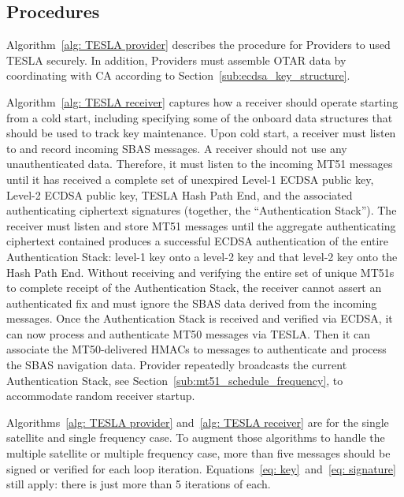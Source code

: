\documentclass[letterpaper,times]{IONconf/IONconf}
\begin{document}
	\subsection{Procedures} \label{sub:procedures}

		Algorithm~\ref{alg: TESLA provider} describes the procedure for Providers to used TESLA securely.
		In addition, Providers must assemble OTAR data by coordinating with CA according to Section~\ref{sub:ecdsa_key_structure}.

		Algorithm~\ref{alg: TESLA receiver} captures how a receiver should operate starting from a cold start, including specifying some of the onboard data structures that should be used to track key maintenance.
		Upon cold start, a receiver must listen to and record incoming SBAS messages.
		A receiver should not use any unauthenticated data.
		Therefore, it must listen to the incoming MT51 messages until it has received a complete set of unexpired Level-1 ECDSA public key, Level-2 ECDSA public key, TESLA Hash Path End, and the associated authenticating ciphertext signatures (together, the ``Authentication Stack'').
		The receiver must listen and store MT51 messages until the aggregate authenticating ciphertext contained produces a successful ECDSA authentication of the entire Authentication Stack: level-1 key onto a level-2 key and that level-2 key onto the Hash Path End.
		Without receiving and verifying the entire set of unique MT51s to complete receipt of the Authentication Stack, the receiver cannot assert an authenticated fix and must ignore the SBAS data derived from the incoming messages.
		Once the Authentication Stack is received and verified via ECDSA, it can now process and authenticate MT50 messages via TESLA.
		Then it can associate the MT50-delivered HMACs to messages to authenticate and process the SBAS navigation data.
		Provider repeatedly broadcasts the current Authentication Stack, see Section~\ref{sub:mt51_schedule_frequency}, to accommodate random receiver startup.

		Algorithms~\ref{alg: TESLA provider} and~\ref{alg: TESLA receiver} are for the single satellite and single frequency case.
		To augment those algorithms to handle the multiple satellite or multiple frequency case, more than five messages should be signed or verified for each loop iteration.
		Equations~\eqref{eq: key}~and~\eqref{eq: signature} still apply: there is just more than 5 iterations of each.
\end{document}
